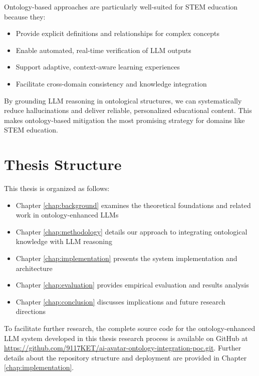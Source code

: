 
Ontology-based approaches are particularly well-suited for STEM education because they:
\begin{itemize}
    \item Provide explicit definitions and relationships for complex concepts
    \item Enable automated, real-time verification of LLM outputs
    \item Support adaptive, context-aware learning experiences
    \item Facilitate cross-domain consistency and knowledge integration
\end{itemize}

By grounding LLM reasoning in ontological structures, we can systematically reduce hallucinations and deliver reliable, personalized educational content. This makes ontology-based mitigation the most promising strategy for domains like STEM education.


\section{Thesis Structure}

This thesis is organized as follows:

\begin{itemize}
    \item Chapter \ref{chap:background} examines the theoretical foundations and related work in ontology-enhanced LLMs
    \item Chapter \ref{chap:methodology} details our approach to integrating ontological knowledge with LLM reasoning
    \item Chapter \ref{chap:implementation} presents the system implementation and architecture
    \item Chapter \ref{chap:evaluation} provides empirical evaluation and results analysis
    \item Chapter \ref{chap:conclusion} discusses implications and future research directions
\end{itemize}

To facilitate further research, the complete source code for the ontology-enhanced LLM system developed in this thesis research process is available on GitHub at \url{https://github.com/9117KET/ai-avatar-ontology-integration-poc.git}. Further details about the repository structure and deployment are provided in Chapter \ref{chap:implementation}.